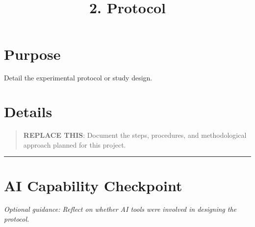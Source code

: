 \documentclass[
]{report}
\title{2. Protocol}
\author{}
\date{}
\renewcommand*\contentsname{Table of contents}
\newcommand\contentsname{Table of contents}
\begin{document}
\maketitle

\renewcommand*\contentsname{Table of contents}
{
\hypersetup{linkcolor=}
\setcounter{tocdepth}{2}
\tableofcontents
}

\chapter{Purpose}\label{purpose}

Detail the experimental protocol or study design.

\chapter{Details}\label{details}

\begin{quote}
\textbf{REPLACE THIS}: Document the steps, procedures, and
methodological approach planned for this project.
\end{quote}

\begin{center}\rule{0.5\linewidth}{0.5pt}\end{center}

\chapter{AI Capability Checkpoint}\label{ai-capability-checkpoint}

\emph{Optional guidance: Reflect on whether AI tools were involved in
designing the protocol.}
\end{document}
